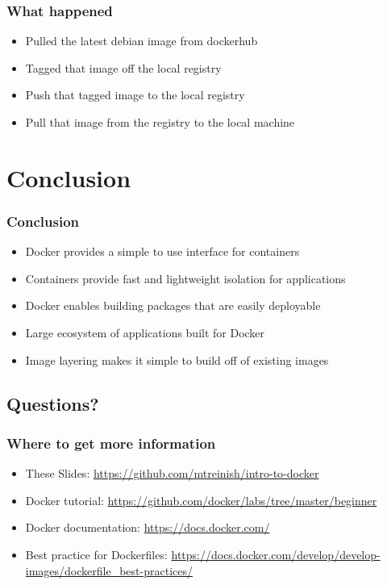 \documentclass[aspectratio=169,11pt,hyperref={colorlinks=true}]{beamer}
\begin{document}
\begin{frame}
    \frametitle{What happened}
    \begin{itemize}
        \item Pulled the latest debian image from dockerhub
        \item Tagged that image off the local registry
        \item Push that tagged image to the local registry
        \item Pull that image from the registry to the local machine
    \end{itemize}
\end{frame}

\section{Conclusion}
\begin{frame}
    \frametitle{Conclusion}
    \begin{itemize}
        \item Docker provides a simple to use interface for containers
        \item Containers provide fast and lightweight isolation for applications
        \item Docker enables building packages that are easily deployable
        \item Large ecosystem of applications built for Docker
        \item Image layering makes it simple to build off of existing images
    \end{itemize}
\end{frame}

\subsection{Questions?}
\begin{frame}
\frametitle{Where to get more information}
    \begin{itemize}
        \item These Slides: \href{https://github.com/mtreinish/intro-to-docker}{https://github.com/mtreinish/intro-to-docker}
        \item Docker tutorial: \href{https://github.com/docker/labs/tree/master/beginner}{https://github.com/docker/labs/tree/master/beginner}
        \item Docker documentation: \href{https://docs.docker.com/}{https://docs.docker.com/}
        \item Best practice for Dockerfiles: \href{https://docs.docker.com/develop/develop-images/dockerfile\_best-practices/}{https://docs.docker.com/develop/develop-images/dockerfile\_best-practices/}
    \end{itemize}
\end{frame}
\end{document}

